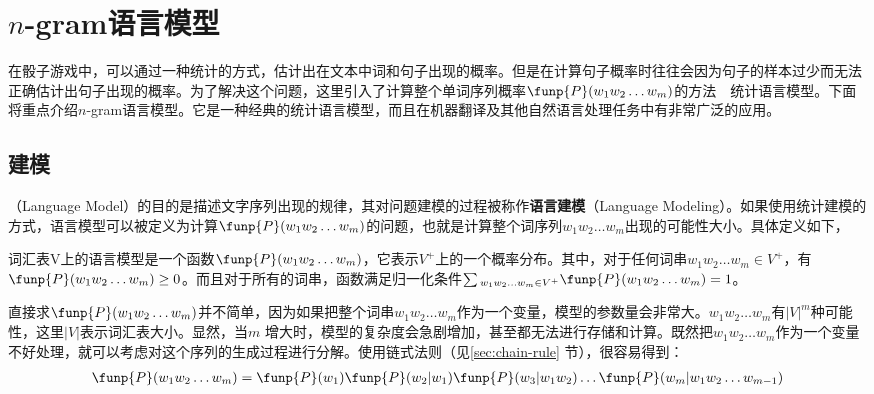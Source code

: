 
\sectionnewpage
\section{$n$-gram语言模型}

\parinterval 在骰子游戏中，可以通过一种统计的方式，估计出在文本中词和句子出现的概率。但是在计算句子概率时往往会因为句子的样本过少而无法正确估计出句子出现的概率。为了解决这个问题，这里引入了计算整个单词序列概率$\funp{P}(w_1 w_2 \ldots w_m)$的方法\ \dash \ 统计语言模型。下面将重点介绍$n$-gram语言模型。它是一种经典的统计语言模型，而且在机器翻译及其他自然语言处理任务中有非常广泛的应用。


\subsection{建模}

（Language Model）的目的是描述文字序列出现的规律，其对问题建模的过程被称作{\small\sffamily\bfseries{语言建模}}（Language Modeling）。如果使用统计建模的方式，语言模型可以被定义为计算$\funp{P}(w_1 w_2 \ldots w_m)$的问题，也就是计算整个词序列$w_1 w_2 \ldots w_m$出现的可能性大小。具体定义如下，

\vspace{0.5em}
\begin{definition}[]
词汇表V上的语言模型是一个函数$\funp{P}(w_1 w_2 \ldots w_m)$，它表示$V^+$上的一个概率分布。其中，对于任何词串$w_1 w_2 \ldots w_m\in{V^+}$，有$\funp{P}(w_1 w_2 \ldots w_m)\geq{0}$。而且对于所有的词串，函数满足归一化条件$\sum{_{w_1 w_2 \ldots w_m\in{V^+}}\funp{P}(w_1 w_2 \ldots w_m)}=1$。
\end{definition}

\parinterval 直接求$\funp{P}(w_1 w_2 \ldots w_m)$并不简单，因为如果把整个词串$w_1 w_2 \ldots w_m$作为一个变量，模型的参数量会非常大。$w_1 w_2 \ldots w_m$有$|V|^m$种可能性，这里$|V|$表示词汇表大小。显然，当$m$ 增大时，模型的复杂度会急剧增加，甚至都无法进行存储和计算。既然把$w_1 w_2 \ldots w_m$作为一个变量不好处理，就可以考虑对这个序列的生成过程进行分解。使用链式法则（见\ref{sec:chain-rule} 节），很容易得到：
\begin{eqnarray}
\funp{P}(w_1 w_2 \ldots w_m)=\funp{P}(w_1)\funp{P}(w_2|w_1)\funp{P}(w_3|w_1 w_2) \ldots \funp{P}(w_m|w_1 w_2 \ldots w_{m-1})
\label{eq:2-22}
\end{eqnarray}

